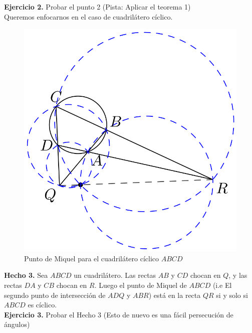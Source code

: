 \documentclass[11pt, a4paper]{article}
\begin{document}
\textbf{Ejercicio 2.} Probar el punto 2 (Pista: Aplicar el teorema 1) \\

Queremos enfocarnos en el caso de cuadril\'atero c\'iclico.
\begin{figure}[h]
	\centering
	\includegraphics[scale=0.25]{p3.2}
	\caption{Punto de Miquel para el cuadril\'atero c\'iclico $ABCD$}
\end{figure}
\textbf{Hecho 3.} Sea $ABCD$ un cuadril\'atero. Las rectas $AB$ y $CD$ chocan en $Q$, y las rectas $DA$ y $CB$ chocan en $R$. Luego el punto de Miquel de $ABCD$ (i.e El segundo punto de intersecci\'on de $ADQ$ y $ABR$) est\'a en la recta $QR$ si y solo si $ABCD$ es c\'iclico.\\

\textbf{Ejercicio 3.} Probar el Hecho 3 (Esto de nuevo es una f\'acil persecuci\'on de \'angulos)
\end{document}
